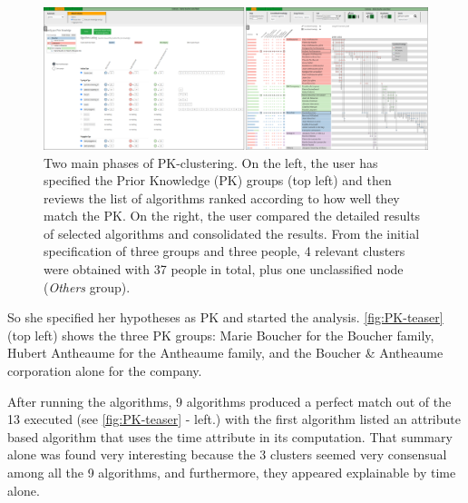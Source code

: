 \begin{figure}
  \centering
  \includegraphics[width=\linewidth]{static/figures/PK-Clustering/VISPaperFigures/teaser_new.png}
  \caption{Two main phases of PK-clustering. On the left, the user has specified the Prior Knowledge (PK) groups (top left) and then reviews the list of algorithms ranked according to how well they match the PK. On the right, the user compared the detailed results of selected algorithms and consolidated the results. From the initial specification of three groups and three people, 4 relevant clusters were obtained with 37 people in total, plus one unclassified node (\textit{Others} group).}
	\label{fig:PK-teaser}
\end{figure}

So she specified her hypotheses as PK and started the analysis. \autoref{fig:PK-teaser} (top left) shows the three PK groups: Marie Boucher for the Boucher family, Hubert Antheaume for the Antheaume family, and the Boucher \& Antheaume corporation alone for the company.

After running the algorithms, 9 algorithms produced a perfect match out of the 13 executed (see \autoref{fig:PK-teaser} - left.) with the first algorithm listed an attribute based algorithm that uses the time attribute in its computation. That summary alone was found very interesting because the 3 clusters seemed very consensual among all the 9 algorithms, and furthermore, they appeared explainable by time alone.


